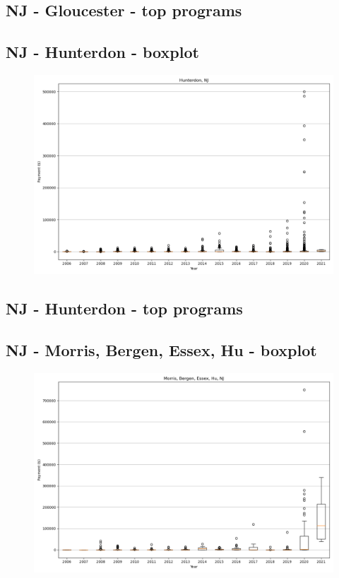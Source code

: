 \subsection*{NJ - Gloucester - top programs}

\newpage
\subsection*{NJ - Hunterdon - boxplot}
\begin{figure}[h]
\centering
\includegraphics[width=7in]{../output/boxplots/counties/Hunterdon-NJ_boxplot.png}
\end{figure}


\subsection*{NJ - Hunterdon - top programs}

\newpage
\subsection*{NJ - Morris, Bergen, Essex, Hu - boxplot}
\begin{figure}[h]
\centering
\includegraphics[width=7in]{../output/boxplots/counties/Morris, Bergen, Essex, Hu-NJ_boxplot.png}
\end{figure}


